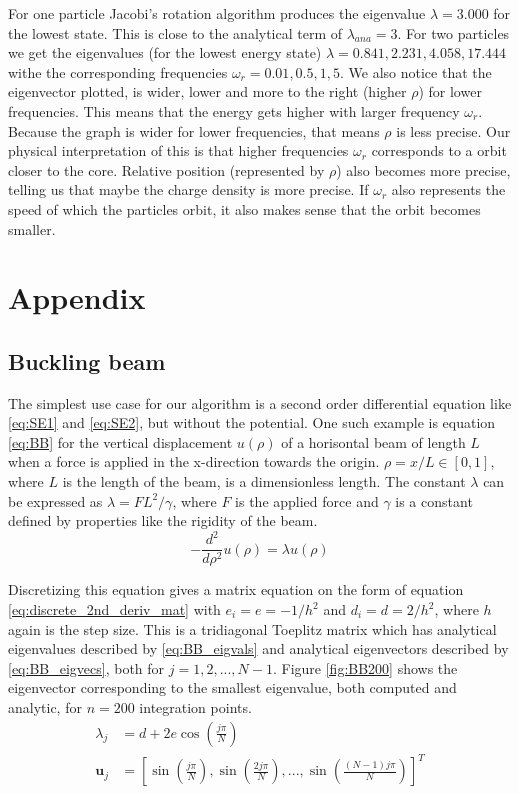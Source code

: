 \documentclass[reprint,english,notitlepage,nofootinbib]{revtex4-1}  %
\begin{document}
For one particle Jacobi's rotation algorithm produces the eigenvalue $\lambda = 3.000$ for the lowest state. This is close to the analytical term of $\lambda_{ana} = 3$. For two particles we get the eigenvalues (for the lowest energy state) $\lambda = 0.841, 2.231, 4.058, 17.444$ withe the corresponding frequencies $\omega_r = 0.01, 0.5, 1, 5$. We also notice that the eigenvector plotted, is wider, lower and more to the right (higher $\rho$) for lower frequencies. This means that the energy gets higher with larger frequency $\omega_r$. Because the graph is wider for lower frequencies, that means $\rho$ is less precise. Our physical interpretation of this is that higher frequencies $\omega_r$ corresponds to a orbit closer to the core. Relative position (represented by $\rho$) also becomes more precise, telling us that maybe the charge density is more precise. If $\omega_r$ also represents the speed of which the particles orbit, it also makes sense that the orbit becomes smaller.

\section{Appendix}
\label{appendix}

\subsection{Buckling beam}

The simplest use case for our algorithm is a second order differential equation like \ref{eq:SE1} and \ref{eq:SE2}, but without the potential. One such example is equation \ref{eq:BB} for the vertical displacement $u(\rho)$ of a horisontal beam of length $L$ when a force is applied in the x-direction towards the origin. $\rho = x/L \in [0, 1]$, where $L$ is the length of the beam, is a dimensionless length. The constant $\lambda$ can be expressed as $\lambda = F L^2 / \gamma$, where $F$ is the applied force and $\gamma$ is a constant defined by properties like the rigidity of the beam.
\begin{equation}
	-\frac{d^2}{d\rho^2}u(\rho) = \lambda u(\rho)
	\label{eq:BB}
\end{equation}

Discretizing this equation gives a matrix equation on the form of equation \ref{eq:discrete_2nd_deriv_mat} with $e_i = e = -1/h^2$ and $d_i = d = 2/h^2$, where $h$ again is the step size. This is a tridiagonal Toeplitz matrix which has analytical eigenvalues described by \ref{eq:BB_eigvals} and analytical eigenvectors described by \ref{eq:BB_eigvecs}, both for $j = 1, 2, ..., N-1$. Figure \ref{fig:BB200} shows the eigenvector corresponding to the smallest eigenvalue, both computed and analytic, for $n = 200$ integration points.
\begin{align}
  \lambda_j &= d + 2 e \cos{\left( \frac{j \pi}{N} \right)} \label{eq:BB_eigvals} \\
  \mathbf u_j &= \left[ \sin{\left( \frac{j \pi}{N} \right)}, \sin{\left( \frac{2 j \pi}{N} \right)}, ..., \sin{\left( \frac{(N-1) j \pi}{N} \right)} \right]^T \label{eq:BB_eigvecs}
\end{align}
\end{document}

